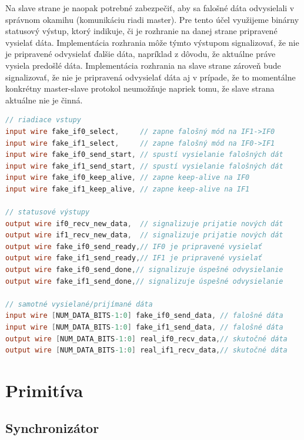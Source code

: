 Na slave strane je naopak potrebné zabezpečiť, aby sa falošné dáta odvysielali v správnom okamihu (komunikáciu riadi master). Pre tento účel využijeme binárny statusový výstup, ktorý indikuje, či je rozhranie na danej strane pripravené vysielať dáta. Implementácia rozhrania môže týmto výstupom signalizovať, že nie je pripravené odvysielať ďalšie dáta, napríklad z dôvodu, že aktuálne práve vysiela predošlé dáta. Implementácia rozhrania na slave strane zároveň bude signalizovať, že nie je pripravená odvysielať dáta aj v prípade, že to momentálne konkrétny master-slave protokol neumožňuje napriek tomu, že slave strana aktuálne nie je činná.

\begin{lstlisting}[float,language=Verilog,caption={Definícia vstupov a výstupov zbernicového rozhrania pre MITM logiku. Parameter NUM\_DATA\_BITS nastaví veľkosť bloku prijímaných/vysielaných dát.},label=alg:busInterface]
// riadiace vstupy
input wire fake_if0_select,     // zapne falošný mód na IF1->IF0
input wire fake_if1_select,     // zapne falošný mód na IF0->IF1
input wire fake_if0_send_start, // spustí vysielanie falošných dát
input wire fake_if1_send_start, // spustí vysielanie falošných dát
input wire fake_if0_keep_alive, // zapne keep-alive na IF0
input wire fake_if1_keep_alive, // zapne keep-alive na IF1

// statusové výstupy
output wire if0_recv_new_data,  // signalizuje prijatie nových dát
output wire if1_recv_new_data,  // signalizuje prijatie nových dát
output wire fake_if0_send_ready,// IF0 je pripravené vysielať   
output wire fake_if1_send_ready,// IF1 je pripravené vysielať   
output wire fake_if0_send_done,// signalizuje úspešné odvysielanie
output wire fake_if1_send_done,// signalizuje úspešné odvysielanie

// samotné vysielané/prijímané dáta
input wire [NUM_DATA_BITS-1:0] fake_if0_send_data, // falošné dáta
input wire [NUM_DATA_BITS-1:0] fake_if1_send_data, // falošné dáta
output wire [NUM_DATA_BITS-1:0] real_if0_recv_data,// skutočné dáta
output wire [NUM_DATA_BITS-1:0] real_if1_recv_data,// skutočné dáta
\end{lstlisting}

\section{Primitíva}

\subsection{Synchronizátor}\label{subsek:synchronizer}

